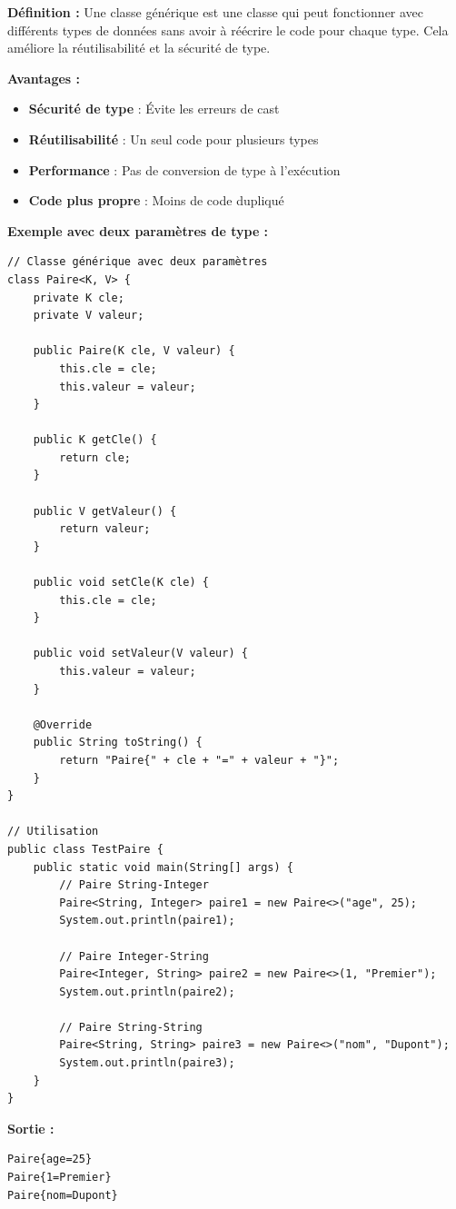\documentclass[11pt,a4paper]{article}
\begin{document}
\begin{correctionbox}
\textbf{Définition :} Une classe générique est une classe qui peut fonctionner avec différents types de données sans avoir à réécrire le code pour chaque type. Cela améliore la réutilisabilité et la sécurité de type.

\textbf{Avantages :}
\begin{itemize}
    \item \textbf{Sécurité de type} : Évite les erreurs de cast
    \item \textbf{Réutilisabilité} : Un seul code pour plusieurs types
    \item \textbf{Performance} : Pas de conversion de type à l'exécution
    \item \textbf{Code plus propre} : Moins de code dupliqué
\end{itemize}

\textbf{Exemple avec deux paramètres de type :}

\begin{lstlisting}
// Classe générique avec deux paramètres
class Paire<K, V> {
    private K cle;
    private V valeur;
    
    public Paire(K cle, V valeur) {
        this.cle = cle;
        this.valeur = valeur;
    }
    
    public K getCle() {
        return cle;
    }
    
    public V getValeur() {
        return valeur;
    }
    
    public void setCle(K cle) {
        this.cle = cle;
    }
    
    public void setValeur(V valeur) {
        this.valeur = valeur;
    }
    
    @Override
    public String toString() {
        return "Paire{" + cle + "=" + valeur + "}";
    }
}

// Utilisation
public class TestPaire {
    public static void main(String[] args) {
        // Paire String-Integer
        Paire<String, Integer> paire1 = new Paire<>("age", 25);
        System.out.println(paire1);
        
        // Paire Integer-String
        Paire<Integer, String> paire2 = new Paire<>(1, "Premier");
        System.out.println(paire2);
        
        // Paire String-String
        Paire<String, String> paire3 = new Paire<>("nom", "Dupont");
        System.out.println(paire3);
    }
}
\end{lstlisting}

\textbf{Sortie :}
\begin{verbatim}
Paire{age=25}
Paire{1=Premier}
Paire{nom=Dupont}
\end{verbatim}
\end{correctionbox}
\end{document}
